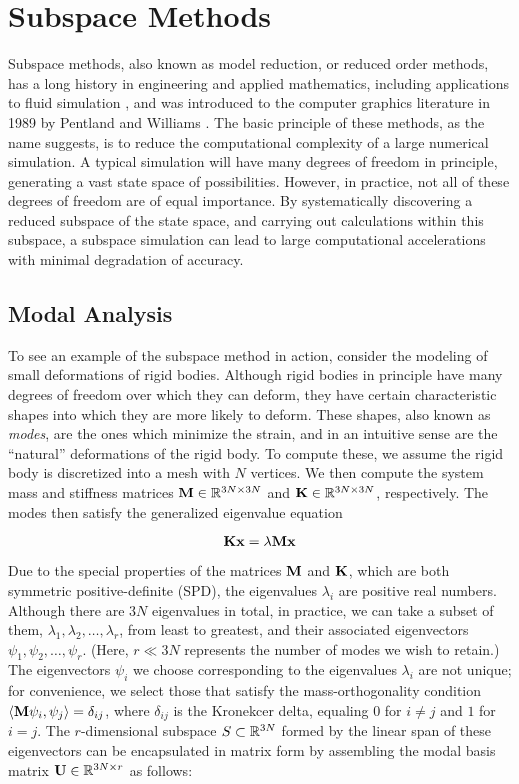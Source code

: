 \section{Subspace Methods}
Subspace methods, also known as model reduction, or reduced order methods, has a long history in engineering and applied mathematics, including applications to fluid simulation \cite{lumley1967}, and was introduced to the computer graphics literature in 1989 by Pentland and Williams \cite{Pentland:1989:GVM, Berkooz93theproper}. The basic principle of these methods, as the name suggests, is to reduce the computational complexity of a large numerical simulation. A typical simulation will have many degrees of freedom in principle, generating a vast state space of possibilities. However, in practice, not all of these degrees of freedom are of equal importance. By systematically discovering a reduced subspace of the state space, and carrying out calculations within this subspace, a subspace simulation can lead to large computational accelerations with minimal degradation of accuracy.

\subsection{Modal Analysis}
\label{sec:modal}
To see an example of the subspace method in action, consider the modeling of small deformations of rigid bodies. Although rigid bodies in principle have many degrees of freedom over which they can deform, they have certain characteristic shapes into which they are more likely to deform. These shapes, also known as {\em modes}, are the ones which minimize the strain, and in an intuitive sense are the ``natural'' deformations of the rigid body. To compute these, we assume the rigid body is discretized into a mesh with $N$ vertices. We then compute the system mass and stiffness matrices $\mathbf{M} \in \mathbb{R}^{3N \times 3N}$ and $\mathbf{K} \in \mathbb{R}^{3N \times 3N}$, respectively. The modes then satisfy the generalized eigenvalue equation

\begin{equation}
	\mathbf{K} \mathbf{x} = \lambda \mathbf{M} \mathbf{x}
\end{equation}

Due to the special properties of the matrices $\mathbf{M}$ and $\mathbf{K}$, which are both symmetric positive-definite (SPD), the eigenvalues $\lambda_i$ are positive real numbers. 
Although there are $3N$ eigenvalues in total, in practice, we can take a subset of them, $\lambda_1, \lambda_2, \dots, \lambda_r$, from least to greatest, and their associated eigenvectors
 $\psi_1, \psi_2, \dots, \psi_r$. (Here, $r \ll 3N$ represents the number of modes we wish to retain.) The eigenvectors $\psi_i$ we choose corresponding to the eigenvalues $\lambda_i$ 
 are not unique; for convenience, we select those that satisfy the mass-orthogonality condition $\langle \mathbf{M} \psi_i, \psi_j \rangle = \delta_{ij}$, where $\delta_{ij}$ is the Kronekcer delta, 
 equaling $0$ for $i \neq j$ and $1$ for $i=j$. The $r$-dimensional subspace $S \subset \mathbb{R}^{3N}$ formed by the linear span of these eigenvectors can be encapsulated in matrix form 
 by assembling the modal basis matrix $\mathbf{U} \in \mathbb{R}^{3N \times r}$ as follows:

